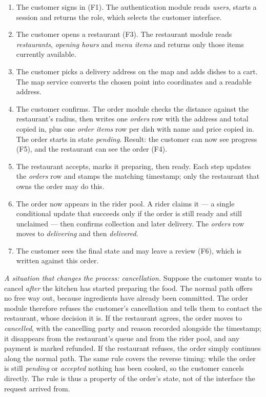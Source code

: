 \begin{enumerate}
\item The customer signs in (F1). The authentication module reads \emph{users}, starts a
session and returns the role, which selects the customer interface.
\item The customer opens a restaurant (F3). The restaurant module reads \emph{restaurants},
\emph{opening hours} and \emph{menu items} and returns only those items currently available.
\item The customer picks a delivery address on the map and adds dishes to a cart. The map
service converts the chosen point into coordinates and a readable address.
\item The customer confirms. The order module checks the distance against the restaurant's
radius, then writes one \emph{orders} row with the address and total copied in, plus one
\emph{order items} row per dish with name and price copied in. The order starts in state
\emph{pending}. Result: the customer can now see progress (F5), and the restaurant can see the
order (F4).
\item The restaurant accepts, marks it preparing, then ready. Each step updates the
\emph{orders} row and stamps the matching timestamp; only the restaurant that owns the order may
do this.
\item The order now appears in the rider pool. A rider claims it --- a single conditional update
that succeeds only if the order is still ready and still unclaimed --- then confirms collection
and later delivery. The \emph{orders} row moves to \emph{delivering} and then \emph{delivered}.
\item The customer sees the final state and may leave a review (F6), which is written against
this order.
\end{enumerate}

\emph{A situation that changes the process: cancellation.} Suppose the customer wants to cancel
\emph{after} the kitchen has started preparing the food. The normal path offers no free way out,
because ingredients have already been committed. The order module therefore refuses the
customer's cancellation and tells them to contact the restaurant, whose decision it is. If the
restaurant agrees, the order moves to \emph{cancelled}, with the cancelling party and reason
recorded alongside the timestamp; it disappears from the restaurant's queue and from the rider
pool, and any payment is marked refunded. If the restaurant refuses, the order simply continues
along the normal path. The same rule covers the reverse timing: while the order is still
\emph{pending} or \emph{accepted} nothing has been cooked, so the customer cancels directly. The rule is thus a property of the order's state, not of the
interface the request arrived from.

